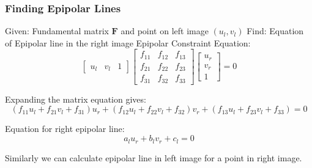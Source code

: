 \begin{frame}
    \frametitle{Finding Epipolar Lines}
    Given: Fundamental matrix $\mathbf{F}$ and point on left image $(u_l, v_l)$
    \vspace{0.2cm}
    Find: Equation of Epipolar line in the right image
    \vspace{0.2cm}
    Epipolar Constraint Equation:
    $$
    \begin{bmatrix} u_l & v_l & 1 \end{bmatrix}
    \begin{bmatrix}
        f_{11} & f_{12} & f_{13} \\
        f_{21} & f_{22} & f_{23} \\
        f_{31} & f_{32} & f_{33}
    \end{bmatrix}
    \begin{bmatrix} u_r \\ v_r \\ 1 \end{bmatrix} = 0
    $$

    Expanding the matrix equation gives:
    $$
    (f_{11} u_l + f_{21} v_l + f_{31}) u_r + (f_{12} u_l + f_{22} v_l + f_{32}) v_r + (f_{13} u_l + f_{23} v_l + f_{33}) = 0
    $$

    Equation for right epipolar line:
    $$\boxed{a_l u_r + b_l v_r + c_l = 0}$$

    Similarly we can calculate epipolar line in left image for a point in right image.
\end{frame}

